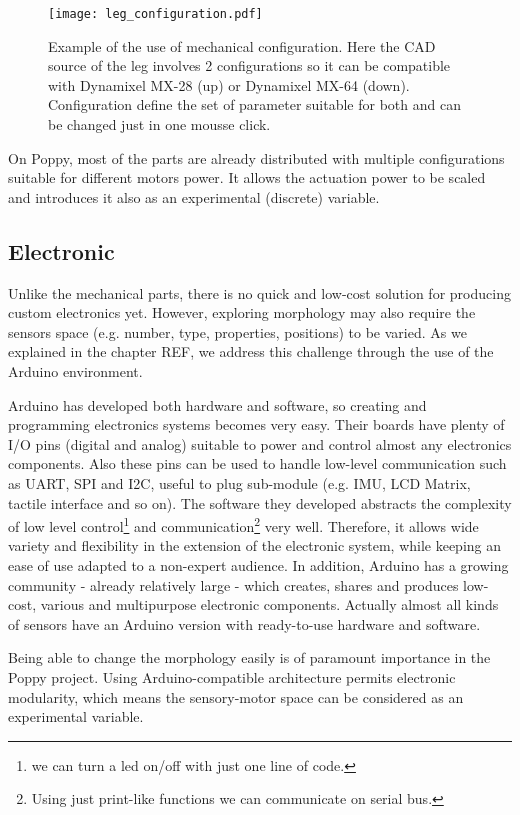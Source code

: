 \begin{figure}[!ht]
    \centering
        \texttt{[image: leg\_configuration.pdf]}
    \caption{Example of the use of mechanical configuration. Here the CAD source of the leg involves 2 configurations so it can be compatible with Dynamixel MX-28 (up) or Dynamixel MX-64 (down). Configuration define the set of parameter suitable for both and can be changed just in one mousse click.}
    \label{fig:leg_configuration}
\end{figure}

On Poppy, most of the parts are already distributed with multiple configurations suitable for different motors power. It allows the actuation power to be scaled and introduces it also as an experimental (discrete) variable.


\subsection{Electronic} %

Unlike the mechanical parts, there is no quick and low-cost solution for producing custom electronics yet.
However, exploring morphology may also require the sensors space (e.g. number, type, properties, positions) to be varied. As we explained in the chapter REF, we address this challenge through the use of the Arduino environment.

Arduino has developed both hardware and software, so creating and programming electronics systems becomes very easy. Their boards have plenty of I/O pins (digital and analog) suitable to power and control almost any electronics components. Also these pins can be used to handle low-level communication such as UART, SPI and I2C, useful to plug sub-module (e.g. IMU, LCD Matrix, tactile interface and so on).
The software they developed abstracts the complexity of low level control\footnote{we can turn a led on/off with just one line of code.} and communication\footnote{Using just print-like functions we can communicate on serial bus.} very well. Therefore, it allows wide variety and flexibility in the extension of the electronic system, while keeping an ease of use adapted to a non-expert audience.
In addition, Arduino has a growing community - already relatively large - which creates, shares and produces low-cost, various and multipurpose electronic components. Actually almost all kinds of sensors have an Arduino version with ready-to-use hardware and software.

Being able to change the morphology easily is of paramount importance in the Poppy project. Using Arduino-compatible architecture permits electronic modularity, which means the sensory-motor space can be considered as an experimental variable.


